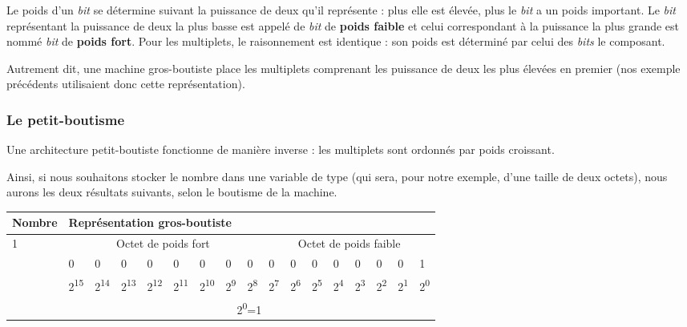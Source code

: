 Le poids d'un \emph{bit} se détermine suivant la puissance de deux qu'il
représente : plus elle est élevée, plus le \emph{bit} a un poids
important. Le \emph{bit} représentant la puissance de deux la plus basse
est appelé de \emph{bit} de \textbf{poids faible} et celui correspondant
à la puissance la plus grande est nommé \emph{bit} de \textbf{poids
fort}. Pour les multiplets, le raisonnement est identique : son poids
est déterminé par celui des \emph{bits} le composant.

Autrement dit, une machine gros-boutiste place les multiplets comprenant
les puissance de deux les plus élevées en premier (nos exemple
précédents utilisaient donc cette représentation).

\subsubsection{Le petit-boutisme}
\label{le-petit-boutisme}

Une architecture petit-boutiste fonctionne de manière inverse : les
multiplets sont ordonnés par poids croissant.

Ainsi, si nous souhaitons stocker le nombre  dans une variable
de type  (qui sera, pour notre exemple, d'une
taille de deux octets), nous aurons les deux résultats suivants, selon
le boutisme de la machine.

\begin{table}
\centering
\begin{tabular}{|l|l|l|l|l|l|l|l|l|l|l|l|l|l|l|l|l|}\hline
\rowcolor{gris-tab-entete}\footnotesize \bf Nombre& \multicolumn{16}{l|}{\footnotesize \bf Représentation gros-boutiste}\\
 \hline
  \multirow{4}{2cm}{1} &\multicolumn{8}{c|}{Octet de poids fort}&\multicolumn{8}{c|}{Octet de poids faible}\\
  & 0 & 0 & 0 & 0 & 0 & 0 & 0 & 0 & 0 & 0 & 0 & 0 & 0 & 0 & 0 & 1 \\ 
  \cline{2-17}
    &2\textsuperscript{15}&2\textsuperscript{14}&2\textsuperscript{13}&2\textsuperscript{12}&2\textsuperscript{11}&2\textsuperscript{10}&2\textsuperscript{9}&2\textsuperscript{8}&2\textsuperscript{7}&2\textsuperscript{6}&2\textsuperscript{5}&2\textsuperscript{4}&2\textsuperscript{3}&2\textsuperscript{2}&2\textsuperscript{1}&2\textsuperscript{0}\\ 
  \cline{2-17}
    &\multicolumn{16}{c|}{2\textsuperscript{0}=1}\\ 
  \hline
  \end{tabular}
\end{table}

